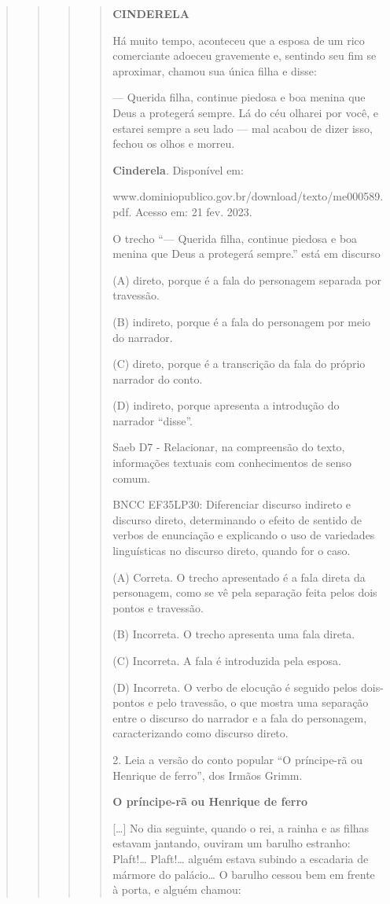 \begin{quote}
\begin{quote}
\begin{quote}
\begin{quote}
\textbf{CINDERELA}

Há muito tempo, aconteceu que a esposa de um rico comerciante adoeceu
gravemente e, sentindo seu fim se aproximar, chamou sua única filha e
disse:

--- Querida filha, continue piedosa e boa menina que Deus a protegerá
sempre. Lá do céu olharei por você, e estarei sempre a seu lado --- mal
acabou de dizer isso, fechou os olhos e morreu.

\textbf{Cinderela}. Disponível em:

www.dominiopublico.gov.br/download/texto/me000589.pdf. Acesso em: 21
fev. 2023.

O trecho ``--- Querida filha, continue piedosa e boa menina que Deus a
protegerá sempre.'' está em discurso

(A) direto, porque é a fala do personagem separada por travessão.

(B) indireto, porque é a fala do personagem por meio do narrador.

(C) direto, porque é a transcrição da fala do próprio narrador do conto.

(D) indireto, porque apresenta a introdução do narrador ``disse''.

Saeb D7 - Relacionar, na compreensão do texto, informações textuais com
conhecimentos de senso comum.

BNCC EF35LP30: Diferenciar discurso indireto e discurso direto,
determinando o efeito de sentido de verbos de enunciação e explicando o
uso de variedades linguísticas no discurso direto, quando for o caso.

(A) Correta. O trecho apresentado é a fala direta da personagem, como se
vê pela separação feita pelos dois pontos e travessão.

(B) Incorreta. O trecho apresenta uma fala direta.

(C) Incorreta. A fala é introduzida pela esposa.

(D) Incorreta. O verbo de elocução é seguido pelos dois-pontos e pelo
travessão, o que mostra uma separação entre o discurso do narrador e a
fala do personagem, caracterizando como discurso direto.

2. Leia a versão do conto popular ``O príncipe-rã ou Henrique de
ferro'', dos Irmãos Grimm.

\textbf{O príncipe-rã ou Henrique de ferro}

{[}\ldots{}{]} No dia seguinte, quando o rei, a rainha e as filhas
estavam jantando, ouviram um barulho estranho: Plaft!\ldots{}
Plaft!\ldots{} alguém estava subindo a escadaria de mármore do
palácio\ldots{} O barulho cessou bem em frente à porta, e alguém chamou:


\end{quote}
\end{quote}
\end{quote}
\end{quote}
